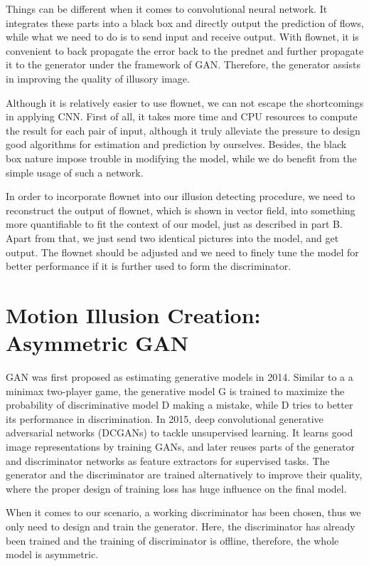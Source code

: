 \documentclass[journal]{IEEEtran}
\begin{document}
  Things can be different when it comes to convolutional neural network. It integrates these parts into a black box and directly output the prediction of flows, while what we need to do is to send input and receive output. With flownet, it is convenient to back propagate the error back to the prednet and further propagate it to the generator under the framework of GAN. Therefore, the generator assists in improving the quality of illusory image.
  
  Although it is relatively easier to use flownet, we can not escape the shortcomings in applying CNN. First of all, it takes more time and CPU resources to compute the result for each pair of input, although it truly alleviate the pressure to design good algorithms for estimation and prediction by ourselves. Besides, the black box nature impose trouble in modifying the model, while we do benefit from the simple usage of such a network.
  
  In order to incorporate flownet into our illusion detecting procedure, we need to reconstruct the output of flownet, which is shown in vector field, into something more quantifiable to fit the context of our model, just as described in part B. Apart from that, we just send two identical pictures into the model, and get output. The flownet should be adjusted and we need to finely tune the model for better performance if it is further used to form the discriminator. 
  
  
  \section{Motion Illusion Creation: Asymmetric GAN}
  \label{sec:generation}
  
  GAN was first proposed as estimating generative models in 2014. Similar to a a minimax two-player game, the generative model G is trained to maximize the probability of discriminative model D making a mistake, while D tries to better its performance in discrimination. \cite{goodfellow2014generative} In 2015, deep convolutional generative adversarial networks (DCGANs) to tackle unsupervised learning. It learns good image representations by training GANs, and later reuses parts of the generator and discriminator networks as feature extractors for supervised tasks.\cite{radford2015unsupervised} The generator and the discriminator are trained alternatively to improve their quality, where the proper design of training loss has huge influence on the final model.
  
  When it comes to our scenario, a working discriminator has been chosen, thus we only need to design and train the generator. Here, the discriminator has already been trained and the training of discriminator is offline, therefore, the whole model is asymmetric.
  
\end{document}
